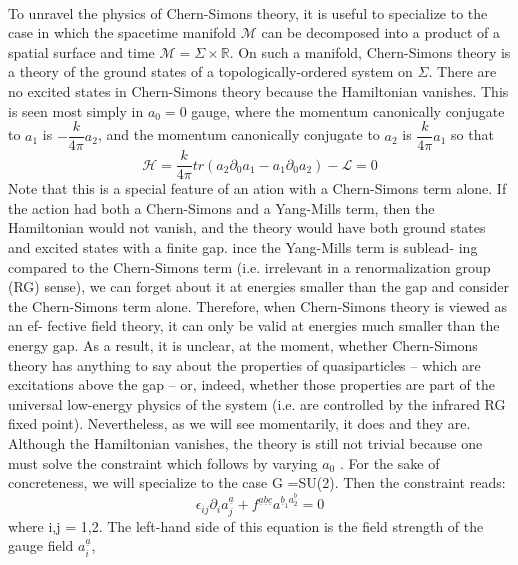 \paragraph{} To unravel the physics of Chern-Simons theory, it is useful to specialize to the case
in which the spacetime manifold $\mathcal{M}$ can be decomposed into a product of a spatial surface and time
$\mathcal{M} = \Sigma \times \mathbb{R}.$ On such a manifold, Chern-Simons theory is a theory of the ground states of a 
topologically-ordered system on $\Sigma$. There are no excited states in Chern-Simons theory because the Hamiltonian vanishes.
This is seen most simply in $a_0 = 0$ gauge, where the momentum canonically conjugate to $a_1$ is $-\dfrac{k}{4\pi}a_{2}$,
and the momentum canonically conjugate to $a_2$ is $\dfrac{k}{4\pi}a_{1}$ so that
\begin{equation}\label{(26)}
 \mathcal{H} = \dfrac{k}{4\pi} tr\left(a_2\partial_0 a_1 - a_1 \partial_0 a_2 \right) - \mathcal{L} = 0
\end{equation}
Note that this is a special feature of an ation with a Chern-Simons term alone. If the action had both a Chern-Simons and
a Yang-Mills term, then the Hamiltonian would not vanish, and the theory would have both ground states and excited states
with a finite gap. ince the Yang-Mills term is sublead-
ing compared to the Chern-Simons term (i.e. irrelevant in a
renormalization group (RG) sense), we can forget about it at
energies smaller than the gap and consider the Chern-Simons
term alone.
Therefore, when Chern-Simons theory is viewed as an ef-
fective field theory, it can only be valid at energies much
 smaller than the energy gap. As a result, it is unclear, at the
moment, whether Chern-Simons theory has anything to say
about the properties of quasiparticles – which are excitations
 above the gap – or, indeed, whether those properties are part
  of the universal low-energy physics of the system (i.e. are
 controlled by the infrared RG fixed point). Nevertheless, as
  we will see momentarily, it does and they are.
 Although the Hamiltonian vanishes, the theory is still not
trivial because one must solve the constraint which follows by
varying $a_{0}$ . For the sake of concreteness, we will specialize to
the case G =SU(2). Then the constraint reads:
\begin{equation}\label{27}
 \epsilon_{ij} \partial_{i}a^{\underline{a}}_{j} + f^{\underline{a} \underline{b}\underline{c}}a^{\underline{b}_{1} 
 a^{\underline{b}}_{2}} = 0
\end{equation}
where i,j = 1,2. The left-hand side of this equation is the field strength of the gauge field $a^{\underline{a}}_{i}$,
